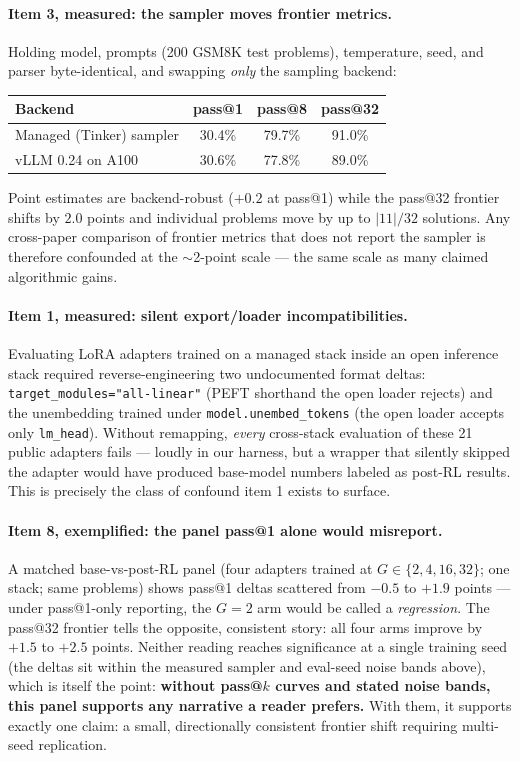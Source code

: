 \documentclass[11pt]{article}
\begin{document}
\paragraph{Item 3, measured: the sampler moves frontier metrics.}
Holding model, prompts (200 GSM8K test problems), temperature, seed, and
parser byte-identical, and swapping \emph{only} the sampling backend:
\begin{center}
\begin{tabular}{@{}lccc@{}}
\toprule
Backend & pass@1 & pass@8 & pass@32 \\
\midrule
Managed (Tinker) sampler & 30.4\% & 79.7\% & 91.0\% \\
vLLM 0.24 on A100 & 30.6\% & 77.8\% & 89.0\% \\
\bottomrule
\end{tabular}
\end{center}
Point estimates are backend-robust ($+0.2$ at pass@1) while the pass@32
frontier shifts by $2.0$ points and individual problems move by up to
$|11|/32$ solutions. Any cross-paper comparison of frontier metrics that
does not report the sampler is therefore confounded at the
$\sim$2-point scale --- the same scale as many claimed algorithmic gains.

\paragraph{Item 1, measured: silent export/loader incompatibilities.}
Evaluating LoRA adapters trained on a managed stack inside an open
inference stack required reverse-engineering two undocumented format
deltas: \texttt{target\_modules="all-linear"} (PEFT shorthand the open
loader rejects) and the unembedding trained under
\texttt{model.unembed\_tokens} (the open loader accepts only
\texttt{lm\_head}). Without remapping, \emph{every} cross-stack evaluation
of these 21 public adapters fails --- loudly in our harness, but a wrapper
that silently skipped the adapter would have produced base-model numbers
labeled as post-RL results. This is precisely the class of confound item 1
exists to surface.

\paragraph{Item 8, exemplified: the panel pass@1 alone would misreport.}
A matched base-vs-post-RL panel (four adapters trained at
$G\in\{2,4,16,32\}$; one stack; same problems) shows pass@1 deltas
scattered from $-0.5$ to $+1.9$ points --- under pass@1-only reporting,
the $G{=}2$ arm would be called a \emph{regression}. The pass@32 frontier
tells the opposite, consistent story: all four arms improve by $+1.5$ to
$+2.5$ points. Neither reading reaches significance at a single training
seed (the deltas sit within the measured sampler and eval-seed noise
bands above), which is itself the point: \textbf{without pass@$k$ curves
and stated noise bands, this panel supports any narrative a reader
prefers.} With them, it supports exactly one claim: a small,
directionally consistent frontier shift requiring multi-seed replication.
\end{document}

